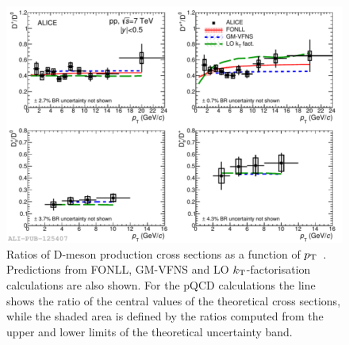 \begin{figure}[!htb]
\begin{center}
\includegraphics[width=1\textwidth]{FigCap4/DmesonRatiosVsModels.pdf}
\caption{Ratios of D-meson production cross sections as a function of $p_{\rm T}$~\cite{Acharya:2017jgo}.
Predictions from FONLL, GM-VFNS and LO $k_{\rm T}$-factorisation calculations
are also shown. For the pQCD calculations the line shows the ratio of
the central values of the theoretical cross sections, while the shaded area is 
defined by the ratios computed from the upper and lower limits of the 
theoretical uncertainty band.}
\label{fig:DratiosVsPt}
\end{center}
\end{figure}


